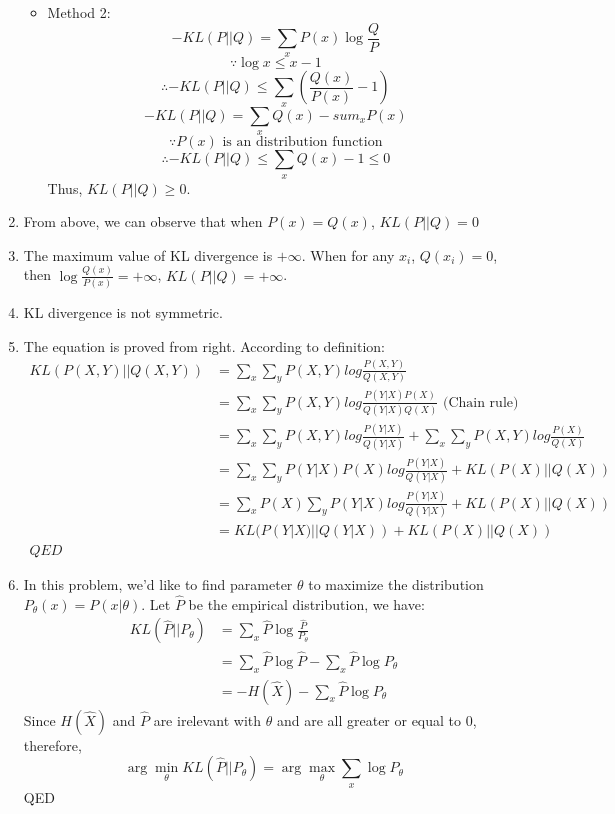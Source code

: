 \documentclass[a4paper, 10pt, titlepage]{article}
\begin{document}
\begin{enumerate}
\begin{itemize}
                \item Method 2:
                    $$-KL(P||Q) = \sum_xP(x)\log{\frac{Q}{P}}$$
                    $$\because \log{x}\leq{}x-1$$
                    $$\therefore -KL(P||Q)\leq\sum_x(\frac{Q(x)}{P(x)}-1)$$
                    $$-KL(P||Q)=\sum_xQ(x)-sum_xP(x)$$
                    $$\because P(x)\mbox{~is an distribution function}$$
                    $$\therefore -KL(P||Q) \leq \sum_xQ(x)-1 \leq 0$$
                    Thus, $KL(P||Q) \geq 0$.
        \end{itemize}
    \item From above, we can observe that when $P(x) = Q(x)$, $KL(P||Q) = 0$
    \item The maximum value of KL divergence is $+\infty$. When for any $x_i$, $Q(x_i)=0$, then $\log{\frac{Q(x)}{P(x)}} = +\infty$, $KL(P||Q) = +\infty$. 
    \item KL divergence is not symmetric. 
    \item   The equation is proved from right. According to definition:
        \begin{align*}
         KL(P(X,Y)||Q(X,Y))&=\sum_x\sum_yP(X,Y)log\frac{P(X,Y)}{Q(X,Y)}\\ 
         &=\sum_x\sum_yP(X,Y)log\frac{P(Y|X)P(X)}{Q(Y|X)Q(X)}\mbox{~(Chain rule)}\\ 
         &= \sum_x\sum_yP(X,Y)log\frac{P(Y|X)}{Q(Y|X)}+\sum_x\sum_yP(X,Y)log\frac{P(X)}{Q(X)}\\ 
         &= \sum_x\sum_yP(Y|X)P(X)log\frac{P(Y|X)}{Q(Y|X)}+KL(P(X)||Q(X))\\ 
         &= \sum_xP(X)\sum_yP(Y|X)log\frac{P(Y|X)}{Q(Y|X)}+KL(P(X)||Q(X))\\ 
         &= KL(P(Y|X)||Q(Y|X))+KL(P(X)||Q(X))\\
         QED
        \end{align*}
    \item In this problem, we'd like to find parameter $\theta$ to maximize the distribution $P_\theta(x) =P(x|\theta)$. Let $\hat{P}$ be the empirical distribution, we have:
        \begin{align*} 
        KL(\hat{P}||P_\theta)&=\sum_x\hat{P}\log\frac{\hat{P}}{P_\theta}\\
        &=\sum_x\hat{P}\log\hat{P}-\sum_x\hat{P}\log{P_\theta}\\
        &=-H(\hat{X})-\sum_x\hat{P}\log{P_\theta}
        \end{align*}
        Since $H(\hat{X})$ and $\hat{P}$ are irelevant with $\theta$ and are all greater or equal to 0, therefore,
        $$\arg{\min_\theta}KL(\hat{P}||P_\theta)=\arg{\max_\theta}\sum_x\log{P_\theta}$$
        QED

\end{enumerate}
\end{document}
